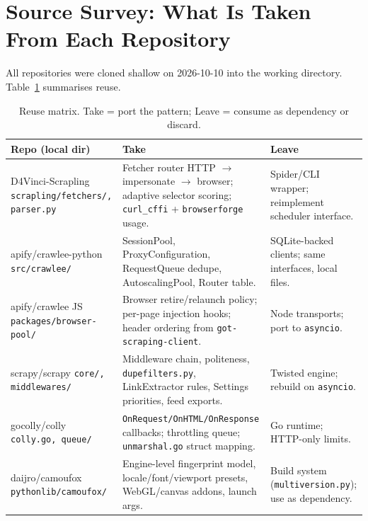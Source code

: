 \documentclass[11pt,a4paper]{article}
\begin{document}
\section{Source Survey: What Is Taken From Each Repository}
All repositories were cloned shallow on 2026-10-10 into the working directory. Table~\ref{tab:borrow} summarises reuse.

\begin{table}[H]
\centering
\caption{Reuse matrix. Take = port the pattern; Leave = consume as dependency or discard.}
\label{tab:borrow}
\begin{tabular}{@{}p{3.2cm}p{5.2cm}p{5.2cm}@{}}
\toprule
Repo (local dir) & Take & Leave \\
\midrule
D4Vinci-Scrapling \newline \texttt{scrapling/fetchers/, parser.py} &
Fetcher router HTTP $\rightarrow$ impersonate $\rightarrow$ browser; adaptive selector scoring; \texttt{curl\_cffi} + \texttt{browserforge} usage. &
Spider/CLI wrapper; reimplement scheduler interface. \\
apify/crawlee-python \newline \texttt{src/crawlee/} &
SessionPool, ProxyConfiguration, RequestQueue dedupe, AutoscalingPool, Router table. &
SQLite-backed clients; same interfaces, local files. \\
apify/crawlee JS \newline \texttt{packages/browser-pool/} &
Browser retire/relaunch policy; per-page injection hooks; header ordering from \texttt{got-scraping-client}. &
Node transports; port to \texttt{asyncio}. \\
scrapy/scrapy \newline \texttt{core/, middlewares/} &
Middleware chain, politeness, \texttt{dupefilters.py}, LinkExtractor rules, Settings priorities, feed exports. &
Twisted engine; rebuild on \texttt{asyncio}. \\
gocolly/colly \newline \texttt{colly.go, queue/} &
\texttt{OnRequest/OnHTML/OnResponse} callbacks; throttling queue; \texttt{unmarshal.go} struct mapping. &
Go runtime; HTTP-only limits. \\
daijro/camoufox \newline \texttt{pythonlib/camoufox/} &
Engine-level fingerprint model, locale/font/viewport presets, WebGL/canvas addons, launch args. &
Build system (\texttt{multiversion.py}); use as dependency. \\

\end{tabular}
\end{table}
\end{document}

